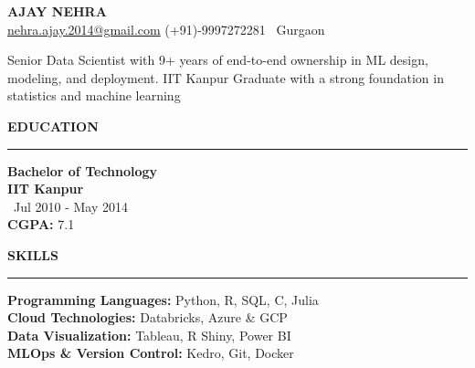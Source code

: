 \documentclass[a4paper,10pt]{article}
\begin{document}
\begin{center}
    \textbf{\LARGE \MakeUppercase{Ajay Nehra}} \\
    \vspace{1mm}
    \href{mailto:nehra.ajay.2014@gmail.com}{nehra.ajay.2014@gmail.com} \hspace{5mm}
    \href{https://www.linkedin.com/in/ajay-n-575bba23/}{\faLinkedin} \hspace{5mm}
    (+91)-9997272281 \hspace{5mm}
    \faMapMarker \, Gurgaon

\end{center}

\vspace{1mm}

{\large
Senior Data Scientist with 9+ years of end-to-end ownership in ML design, modeling, and deployment. IIT Kanpur Graduate with a strong foundation in statistics and machine learning
}

\vspace{1mm}

\begin{multicols}{2}

\textbf{\LARGE \MakeUppercase{Education}} \\
\rule{\columnwidth}{0.8pt}
\textbf{Bachelor of Technology} \\
\textbf{IIT Kanpur} \\
\faCalendar \, Jul 2010 - May 2014 \\
\textbf{CGPA:} 7.1

\columnbreak

\textbf{\LARGE \MakeUppercase{Skills}} \\
\rule{\columnwidth}{0.8pt}
\textbf{Programming Languages:} Python, R, SQL, C, Julia\\
\textbf{Cloud Technologies:} Databricks, Azure \& GCP\\
\textbf{Data Visualization:} Tableau, R Shiny, Power BI \\
\textbf{MLOps \& Version Control:} Kedro, Git, Docker

\end{multicols}
\end{document}
